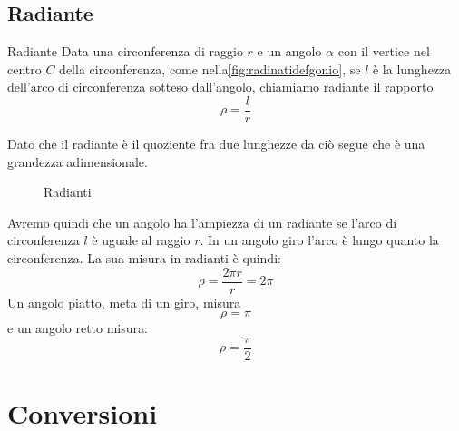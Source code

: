\subsection{Radiante}
\begin{definizionet}{Radiante}{}
	Data una circonferenza di raggio $r$ e un angolo $\alpha$ con il vertice nel centro $C$ della circonferenza, come nella\nobs\vref{fig:radinatidefgonio}, se $l$ è la lunghezza dell'arco di circonferenza sotteso dall'angolo, chiamiamo radiante il rapporto \[\rho=\dfrac{l}{r} \]
\end{definizionet}
Dato che il radiante è il quoziente fra due lunghezze da ciò segue che è una grandezza adimensionale.
\begin{figure}
	\centering
	
	\caption{Radianti}
	\label{fig:radinatidefgonio}
\end{figure}
Avremo quindi che un angolo ha l'ampiezza di un radiante se l'arco di circonferenza $l$ è uguale al raggio $r$.
In un angolo giro l'arco è lungo quanto la circonferenza. La sua misura in radianti è quindi:\[\rho=\dfrac{2\pi r}{r}=2\pi\]
Un angolo piatto, meta di un giro, misura \[\rho=\pi\] e un angolo
retto misura: \[\rho=\dfrac{\pi}{2} \] 
\section{Conversioni}
